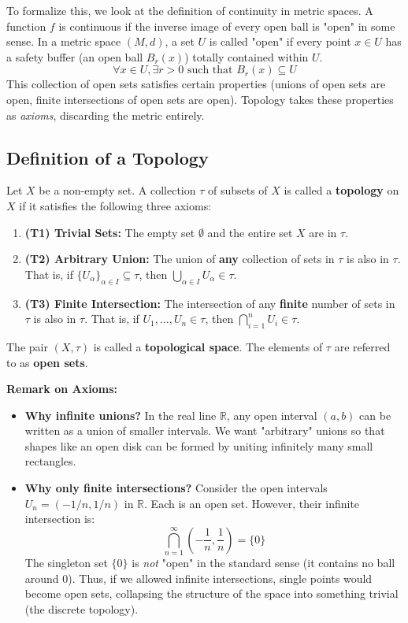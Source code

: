 To formalize this, we look at the definition of continuity in metric spaces. A function $f$ is continuous if the inverse image of every open ball is "open" in some sense. In a metric space $(M, d)$, a set $U$ is called "open" if every point $x \in U$ has a safety buffer (an open ball $B_r(x)$) totally contained within $U$.
\[ \forall x \in U, \exists r > 0 \text{ such that } B_r(x) \subseteq U \]
This collection of open sets satisfies certain properties (unions of open sets are open, finite intersections of open sets are open). Topology takes these properties as \textit{axioms}, discarding the metric entirely.

\subsection{Definition of a Topology}

\begin{definition}
Let $X$ be a non-empty set. A collection $\tau$ of subsets of $X$ is called a \textbf{topology} on $X$ if it satisfies the following three axioms:
\begin{enumerate}
    \item \textbf{(T1) Trivial Sets:} The empty set $\emptyset$ and the entire set $X$ are in $\tau$.
    \item \textbf{(T2) Arbitrary Union:} The union of \textbf{any} collection of sets in $\tau$ is also in $\tau$. That is, if $\{U_\alpha\}_{\alpha \in I} \subseteq \tau$, then $\bigcup_{\alpha \in I} U_\alpha \in \tau$.
    \item \textbf{(T3) Finite Intersection:} The intersection of any \textbf{finite} number of sets in $\tau$ is also in $\tau$. That is, if $U_1, \dots, U_n \in \tau$, then $\bigcap_{i=1}^n U_i \in \tau$.
\end{enumerate}
The pair $(X, \tau)$ is called a \textbf{topological space}. The elements of $\tau$ are referred to as \textbf{open sets}.
\end{definition}

\textbf{Remark on Axioms:}
\begin{itemize}
    \item \textbf{Why infinite unions?} In the real line $\mathbb{R}$, any open interval $(a, b)$ can be written as a union of smaller intervals. We want "arbitrary" unions so that shapes like an open disk can be formed by uniting infinitely many small rectangles.
    \item \textbf{Why only finite intersections?} Consider the open intervals $U_n = (-1/n, 1/n)$ in $\mathbb{R}$. Each is an open set. However, their infinite intersection is:
    \[ \bigcap_{n=1}^{\infty} \left(-\frac{1}{n}, \frac{1}{n}\right) = \{0\} \]
    The singleton set $\{0\}$ is \textit{not} "open" in the standard sense (it contains no ball around 0). Thus, if we allowed infinite intersections, single points would become open sets, collapsing the structure of the space into something trivial (the discrete topology).
\end{itemize}

